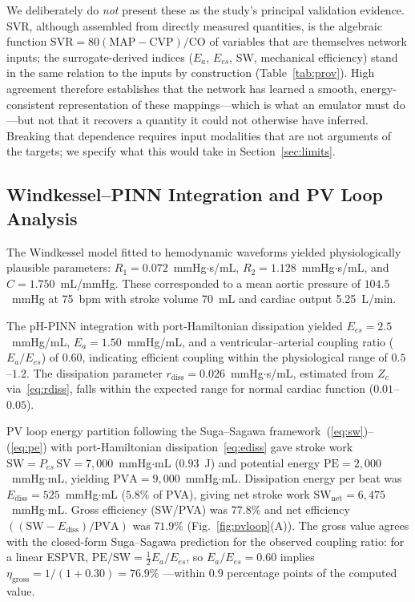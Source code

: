 \documentclass[journal]{IEEEtran}
\begin{document}
We deliberately do \emph{not} present these as the study's principal validation evidence. SVR, although assembled from directly measured quantities, is the algebraic function $\text{SVR}=80(\text{MAP}-\text{CVP})/\text{CO}$ of variables that are themselves network inputs; the surrogate-derived indices ($E_a$, $E_{es}$, SW, mechanical efficiency) stand in the same relation to the inputs by construction (Table~\ref{tab:prov}). High agreement therefore establishes that the network has learned a smooth, energy-consistent representation of these mappings---which is what an emulator must do---but not that it recovers a quantity it could not otherwise have inferred. Breaking that dependence requires input modalities that are not arguments of the targets; we specify what this would take in Section~\ref{sec:limits}.

\subsection{Windkessel--PINN Integration and PV Loop Analysis}\label{sec:wkpv}
The Windkessel model fitted to hemodynamic waveforms yielded physiologically plausible parameters: $R_1=0.072$~mmHg$\cdot$s/mL, $R_2=1.128$~mmHg$\cdot$s/mL, and $C=1.750$~mL/mmHg. These corresponded to a mean aortic pressure of $104.5$~mmHg at 75~bpm with stroke volume 70~mL and cardiac output 5.25~L/min.

The pH-PINN integration with port-Hamiltonian dissipation yielded $E_{es}=2.5$~mmHg/mL, $E_a=1.50$~mmHg/mL, and a ventricular--arterial coupling ratio ($E_a/E_{es}$) of 0.60, indicating efficient coupling within the physiological range of $0.5$--$1.2$. The dissipation parameter $r_{\text{diss}}=0.026$~mmHg$\cdot$s/mL, estimated from $Z_c$ via~\eqref{eq:rdiss}, falls within the expected range for normal cardiac function ($0.01$--$0.05$).

PV loop energy partition following the Suga--Sagawa framework~(\ref{eq:sw})--(\ref{eq:pe}) with port-Hamiltonian dissipation~\eqref{eq:ediss} gave stroke work $\text{SW}=P_{es}\,\text{SV}=7{,}000$~mmHg$\cdot$mL ($0.93$~J) and potential energy $\text{PE}=2{,}000$~mmHg$\cdot$mL, yielding $\text{PVA}=9{,}000$~mmHg$\cdot$mL. Dissipation energy per beat was $E_{\text{diss}}=525$~mmHg$\cdot$mL ($5.8\%$ of PVA), giving net stroke work $\text{SW}_{\text{net}}=6{,}475$~mmHg$\cdot$mL. Gross efficiency (SW/PVA) was $77.8\%$ and net efficiency $((\text{SW}-E_{\text{diss}})/\text{PVA})$ was $71.9\%$ (Fig.~\ref{fig:pvloop}(A)). The gross value agrees with the closed-form Suga--Sagawa prediction for the observed coupling ratio: for a linear ESPVR, $\text{PE}/\text{SW}=\tfrac{1}{2}E_a/E_{es}$, so $E_a/E_{es}=0.60$ implies $\eta_{\text{gross}}=1/(1+0.30)=76.9\%$ \cite{suga1974}---within $0.9$ percentage points of the computed value.
\end{document}
